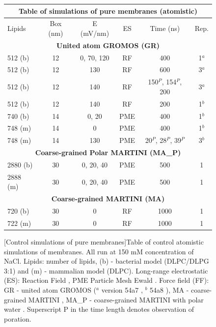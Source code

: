 \begin{figure}[h!]
\centering
\vspace{1cm}
\scriptsize
 \def\arraystretch{1.6}
\begin{tabular}{lccccc}
 \multicolumn{6}{c}{\small \textbf{Table of simulations of pure membranes (atomistic)}} \\
  \hline
 Lipids & Box (nm) & E (mV/nm) & ES & $\,$Time (ns)$\,$ & Rep. \\
 \hline
 \multicolumn{6}{c}{\textbf{United atom GROMOS (GR)}} \\
 512 (b) & 12 & 0, 70, 120 	& RF & 400 							& 1$^a$ \\
 512 (b) & 12 & 130 			& RF & 600 							& 3$^a$ \\
 512 (b) & 12 & 140 			& RF & 150$^{P}$, 154$^{P}$, 200 	& 3$^a$ \\
 512 (b) & 12 & 140 			& RF & 200 							& 1$^b$ \\
 740 (b) & 14 & 0, 20		& PME & 400 							& 1$^b$ \\
 748 (m) & 14 & 0			& PME & 400							& 1$^b$ \\
 748 (m) & 14 & 130 			& PME & 20$^{P}$, 28$^{P}$, 39$^{P}$ & 3$^b$ \\
 \hline
 \multicolumn{6}{c}{\textbf{Coarse-grained Polar MARTINI (MA\_P)}} \\
 2880 (b) & 30 & 0, 20, 40 & PME & 500 & 1 \\
 2888 (m) & 30 & 0, 20, 40 & PME & 500 & 1 \\
 \hline
 \multicolumn{6}{c}{\textbf{Coarse-grained MARTINI (MA)}} \\
 720 (b) & 30 & 0 & RF & 1000 & 1 \\
 722 (m) & 30 & 0 & RF & 1000 & 1 \\
 \hline
\end{tabular}
\vspace{0.5cm}
[Control simulations of pure membranes]{Table of control atomistic simulations of membranes. All run at 150 mM concentration of NaCl. 
%
Lipids: number of lipids, (b) - bacterial model (DLPC/DLPG 3:1) and (m) - mammalian model (DLPC).
%
Long-range electrostatic (ES): Reaction Field \citep{Tironi1995}, PME Particle Mesh Ewald \citep{Essmann1995}.
%
Force field (FF): GR - united atom GROMOS ($^a$ version 54a7 \citep{Schmid2011}, $^b$ 54a8 \citep{Reif2012}), MA - coarse-grained MARTINI \citep{Marrink2007, Monticelli2008}, MA\_P - coarse-grained MARTINI with polar water \citep{Yesylevskyy2010}.
%
Superscript P in the time length denotes observation of poration.}
\label{table:SI_membrane}
\end{figure}
